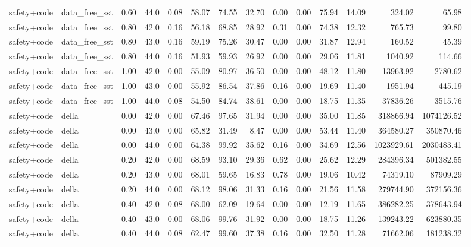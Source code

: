 \documentclass{article}
\begin{document}
\begin{table}[H]
{\begin{tabular}{llllrrrrrrrrrr}
safety+code & data\_free\_sst & 0.60 & 44.0 & 0.08 & 58.07 & 74.55 & 32.70 & 0.00 & 0.00 & 75.94 & 14.09 & 324.02 & 65.98 \\
safety+code & data\_free\_sst & 0.80 & 42.0 & 0.16 & 56.18 & 68.85 & 28.92 & 0.31 & 0.00 & 74.38 & 12.32 & 765.73 & 99.80 \\
safety+code & data\_free\_sst & 0.80 & 43.0 & 0.16 & 59.19 & 75.26 & 30.47 & 0.00 & 0.00 & 31.87 & 12.94 & 160.52 & 45.39 \\
safety+code & data\_free\_sst & 0.80 & 44.0 & 0.16 & 51.93 & 59.93 & 26.92 & 0.00 & 0.00 & 29.06 & 11.81 & 1040.92 & 114.66 \\
safety+code & data\_free\_sst & 1.00 & 42.0 & 0.00 & 55.09 & 80.97 & 36.50 & 0.00 & 0.00 & 48.12 & 11.80 & 13963.92 & 2780.62 \\
safety+code & data\_free\_sst & 1.00 & 43.0 & 0.00 & 55.92 & 86.54 & 37.86 & 0.16 & 0.00 & 19.69 & 11.40 & 1951.94 & 445.19 \\
safety+code & data\_free\_sst & 1.00 & 44.0 & 0.08 & 54.50 & 84.74 & 38.61 & 0.00 & 0.00 & 18.75 & 11.35 & 37836.26 & 3515.76 \\
safety+code & della & 0.00 & 42.0 & 0.00 & 67.46 & 97.65 & 31.94 & 0.00 & 0.00 & 35.00 & 11.85 & 318866.94 & 1074126.52 \\
safety+code & della & 0.00 & 43.0 & 0.00 & 65.82 & 31.49 & 8.47 & 0.00 & 0.00 & 53.44 & 11.40 & 364580.27 & 350870.46 \\
safety+code & della & 0.00 & 44.0 & 0.00 & 64.38 & 99.92 & 35.62 & 0.16 & 0.00 & 34.69 & 12.56 & 1023929.61 & 2030483.41 \\
safety+code & della & 0.20 & 42.0 & 0.00 & 68.59 & 93.10 & 29.36 & 0.62 & 0.00 & 25.62 & 12.29 & 284396.34 & 501382.55 \\
safety+code & della & 0.20 & 43.0 & 0.00 & 68.01 & 59.65 & 16.83 & 0.78 & 0.00 & 19.06 & 10.42 & 74319.10 & 87909.29 \\
safety+code & della & 0.20 & 44.0 & 0.00 & 68.12 & 98.06 & 31.33 & 0.16 & 0.00 & 21.56 & 11.58 & 279744.90 & 372156.36 \\
safety+code & della & 0.40 & 42.0 & 0.08 & 68.00 & 62.09 & 19.64 & 0.00 & 0.00 & 12.19 & 11.65 & 386282.25 & 378643.94 \\
safety+code & della & 0.40 & 43.0 & 0.00 & 68.06 & 99.76 & 31.92 & 0.00 & 0.00 & 18.75 & 11.26 & 139243.22 & 623880.35 \\
safety+code & della & 0.40 & 44.0 & 0.08 & 62.47 & 99.60 & 37.38 & 0.16 & 0.00 & 32.50 & 11.28 & 71662.06 & 181238.32 \\

\end{tabular}}
\end{table}
\end{document}

